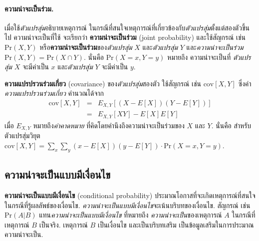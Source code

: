 
\paragraph{ความน่าจะเป็นร่วม.}
เมื่อใช้\textit{ตัวแปรสุ่ม}อธิบายเหตุการณ์
ในกรณีที่สนใจเหตุการณ์ที่เกี่ยวข้องกับ\textit{ตัวแปรสุ่ม}ตั้งแต่สองตัวขึ้นไป 
ความน่าจะเป็นที่ใช้ จะเรียกว่า
\textbf{ความน่าจะเป็นร่วม} (joint probability)
และใช้สัญกรณ์ 
เช่น $\mathrm{Pr}(X, Y)$ หรือ\textbf{ความน่าจะเป็นร่วม}ของ\textit{ตัวแปรสุ่ม} $X$ และ\textit{ตัวแปรสุ่ม} $Y$
และ\textit{ความน่าจะเป็นร่วม}
$\mathrm{Pr}(X, Y) = \mathrm{Pr}(X \cap Y)$.
นั่นคือ
$\mathrm{Pr}(X = x, Y = y)$
หมายถึง
ความน่าจะเป็นที่
\textit{ตัวแปรสุ่ม} $X$ จะมีค่าเป็น $x$
และ\textit{ตัวแปรสุ่ม} $Y$ จะมีค่าเป็น $y$.

\textbf{ความแปรปรวนร่วมเกี่ยว} (covariance)
ของ\textit{ตัวแปรสุ่ม}สองตัว
ใช้สัญกรณ์ เช่น
$\mathrm{cov}[X, Y]$
ซึ่งค่า\textit{ความแปรปรวนร่วมเกี่ยว} คำนวณได้จาก
\begin{eqnarray}
\mathrm{cov}[X, Y] &=& 
E_{X,Y}[(X - E[X])(Y - E[Y])]
\nonumber \\
&=& E_{X,Y}[XY] - E[X]E[Y]
\label{eq: prob covariance}
\end{eqnarray}
เมื่อ $E_{X,Y}$ หมายถึง\textit{ค่าคาดหมาย} ที่คิดโดยคำนึงถึงความน่าจะเป็นร่วมของ $X$ และ $Y$.
นั่นคือ
สำหรับตัวแปรสุ่มวิยุต
$ 
\mathrm{cov}[X, Y] =
\sum_x \sum_y (x - E[X])(y - E[Y]) \cdot \mathrm{Pr}(X=x, Y=y)$.


\subsection{ความน่าจะเป็นแบบมีเงื่อนไข} 
\label{sec: cond prob}

\textbf{ความน่าจะเป็นแบบมีเงื่อนไข} (conditional probability) 
ประมาณโอกาสที่จะเกิดเหตุการณ์ที่สนใจ ในกรณีที่รู้ผลลัพธ์ของเงื่อนไข.
\textit{ความน่าจะเป็นแบบมีเงื่อนไข}จะเน้นบริบทของเงื่อนไข.
สัญกรณ์ เช่น $\mathrm{Pr}(A|B)$ 
แทน\textit{ความน่าจะเป็นแบบมีเงื่อนไข} 
ที่หมายถึง \textit{ความน่าจะเป็น}ของเหตุการณ์ $A$
ในกรณีที่เหตุการณ์ $B$ เป็นจริง.
เหตุการณ์ $B$ เป็นเงื่อนไข
และเป็นบริบทเสริม เป็นข้อมูลเสริมในการประมาณความน่าจะเป็น.

